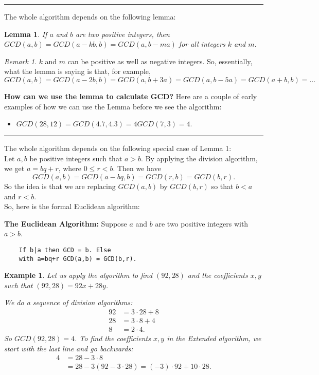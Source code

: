 \documentclass[12pt]{article}
\theoremstyle{plain}
\newtheorem{lemma}{Lemma}
\newtheorem{example}{Example}
\theoremstyle{definition}
\theoremstyle{remark}
\newtheorem{remark}{Remark}
\begin{document}
\hrule

\bigskip
\noindent
The whole algorithm depends on the following lemma:
\begin{lemma}
If $a$ and $b$ are two positive integers, then $GCD(a,b)=GCD(a-kb,b) = GCD(a, b-ma)$ for all integers $k$ and $m$.
\end{lemma}
\begin{remark}
$k$ and $m$ can be positive as well as negative integers. So, essentially, what the lemma is saying is that, for example,
$$GCD(a,b) = GCD(a-2b, b) = GCD(a, b+3a)=GCD(a,b-5a)  = GCD(a+b,b) = \dots $$
\end{remark}

\bigskip
\noindent
{\bf How can we use the lemma to calculate GCD?}
Here are a couple of early examples of how we can use the Lemma before we see the algorithm:
\begin{itemize}
    \item $GCD(28,12) =GCD(4.7,4.3)=4GCD(7,3)=4.$
\end{itemize}

\bigskip
\hrule

\bigskip
\noindent The whole algorithm depends on the following special case of Lemma 1: \\
Let $a, b$ be positive integers such that $a>b$. By applying the division algorithm, we get $a=bq+r$, where $0\leq r<b$. Then we have
$$GCD(a,b) = GCD(a-bq, b) = GCD(r,b) = GCD(b,r).$$
So the idea is that we are replacing $GCD(a,b)$ by $GCD(b,r)$ so that $b<a$ and $r<b$. \\
So, here is the formal Euclidean algorithm:

\bigskip
\noindent
{\bf The Euclidean Algorithm:} Suppose $a$ and $b$ are two positive integers with $a>b$.
\begin{verbatim}
    If b|a then GCD = b. Else
    with a=bq+r GCD(a,b) = GCD(b,r).
\end{verbatim}

\begin{example}
Let us apply the algorithm to find $(92,28)$ and the coefficients $x,y$ such that $(92,28)=92x+28y$.

We do a sequence of division algorithms:
\begin{align*}
    92&=3\cdot 28+8 \\
    28&=3\cdot 8+4\\
    8&=2\cdot 4.
\end{align*}
So $GCD(92,28)=4$. To find the coefficients $x, y$ in the Extended algorithm, we start with the last line and go backwards:
\begin{align*}
    4 & = 28-3\cdot 8 \\
     & = 28-3(92-3\cdot 28) = (-3)\cdot 92+10\cdot 28.
\end{align*}
\end{example}
\end{document}
